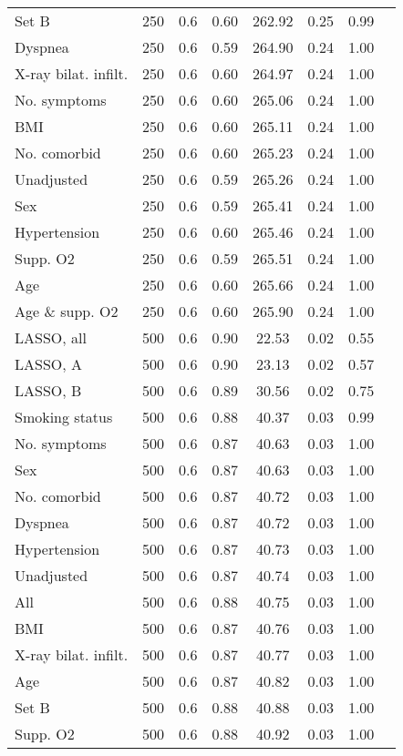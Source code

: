 \documentclass{article}
\begin{document}
{\begin{longtable}{lccccccc}
Set B & 250 & 0.6 & 0.60 & 262.92 & 0.25 & 0.99\\
Dyspnea & 250 & 0.6 & 0.59 & 264.90 & 0.24 & 1.00\\
X-ray bilat. infilt. & 250 & 0.6 & 0.60 & 264.97 & 0.24 & 1.00\\
No. symptoms & 250 & 0.6 & 0.60 & 265.06 & 0.24 & 1.00\\
BMI & 250 & 0.6 & 0.60 & 265.11 & 0.24 & 1.00\\
No. comorbid & 250 & 0.6 & 0.60 & 265.23 & 0.24 & 1.00\\
Unadjusted & 250 & 0.6 & 0.59 & 265.26 & 0.24 & 1.00\\
Sex & 250 & 0.6 & 0.59 & 265.41 & 0.24 & 1.00\\
Hypertension & 250 & 0.6 & 0.60 & 265.46 & 0.24 & 1.00\\
Supp. O2 & 250 & 0.6 & 0.59 & 265.51 & 0.24 & 1.00\\
Age & 250 & 0.6 & 0.60 & 265.66 & 0.24 & 1.00\\
Age \& supp. O2 & 250 & 0.6 & 0.60 & 265.90 & 0.24 & 1.00\\ \midrule
LASSO, all & 500 & 0.6 & 0.90 & 22.53 & 0.02 & 0.55\\
LASSO, A & 500 & 0.6 & 0.90 & 23.13 & 0.02 & 0.57\\
LASSO, B & 500 & 0.6 & 0.89 & 30.56 & 0.02 & 0.75\\
Smoking status & 500 & 0.6 & 0.88 & 40.37 & 0.03 & 0.99\\
No. symptoms & 500 & 0.6 & 0.87 & 40.63 & 0.03 & 1.00\\
Sex & 500 & 0.6 & 0.87 & 40.63 & 0.03 & 1.00\\
No. comorbid & 500 & 0.6 & 0.87 & 40.72 & 0.03 & 1.00\\
Dyspnea & 500 & 0.6 & 0.87 & 40.72 & 0.03 & 1.00\\
Hypertension & 500 & 0.6 & 0.87 & 40.73 & 0.03 & 1.00\\
Unadjusted & 500 & 0.6 & 0.87 & 40.74 & 0.03 & 1.00\\
All & 500 & 0.6 & 0.88 & 40.75 & 0.03 & 1.00\\
BMI & 500 & 0.6 & 0.87 & 40.76 & 0.03 & 1.00\\
X-ray bilat. infilt. & 500 & 0.6 & 0.87 & 40.77 & 0.03 & 1.00\\
Age & 500 & 0.6 & 0.87 & 40.82 & 0.03 & 1.00\\
Set B & 500 & 0.6 & 0.88 & 40.88 & 0.03 & 1.00\\
Supp. O2 & 500 & 0.6 & 0.88 & 40.92 & 0.03 & 1.00\\

\end{longtable}}
\end{document}
